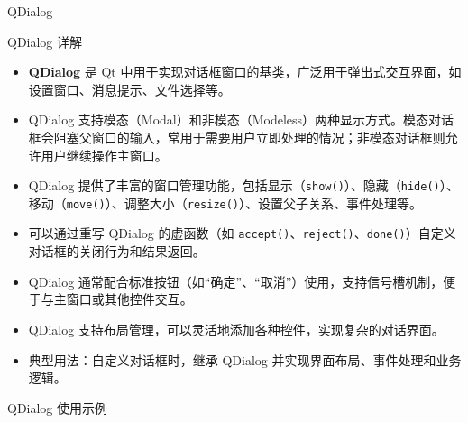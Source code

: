 \documentclass[UTF8,aspectratio=169]{beamer}
\begin{document}
\begin{frame}{QDialog}
    \begin{ytublock}{QDialog 详解}
        \begin{itemize}
            \item \textbf{QDialog} 是 Qt 中用于实现对话框窗口的基类，广泛用于弹出式交互界面，如设置窗口、消息提示、文件选择等。
            \item QDialog 支持模态（Modal）和非模态（Modeless）两种显示方式。模态对话框会阻塞父窗口的输入，常用于需要用户立即处理的情况；非模态对话框则允许用户继续操作主窗口。
            \item QDialog 提供了丰富的窗口管理功能，包括显示（\texttt{show()}）、隐藏（\texttt{hide()}）、移动（\texttt{move()}）、调整大小（\texttt{resize()}）、设置父子关系、事件处理等。
            \item 可以通过重写 QDialog 的虚函数（如 \texttt{accept()}、\texttt{reject()}、\texttt{done()}）自定义对话框的关闭行为和结果返回。
            \item QDialog 通常配合标准按钮（如“确定”、“取消”）使用，支持信号槽机制，便于与主窗口或其他控件交互。
            \item QDialog 支持布局管理，可以灵活地添加各种控件，实现复杂的对话界面。
            \item 典型用法：自定义对话框时，继承 QDialog 并实现界面布局、事件处理和业务逻辑。
        \end{itemize}
    \end{ytublock}
\end{frame}

\begin{frame}[fragile]{QDialog 使用示例}
    \begin{columns}
        \begin{column}{0.48\textwidth}
            \inputminted[firstline=1,lastline=20]{cpp}{code/qt_dialog_example.cpp}
        \end{column}
        \begin{column}{0.48\textwidth}
            \inputminted[firstline=21,lastline=40]{cpp}{code/qt_dialog_example.cpp}
        \end{column}
    \end{columns}
\end{frame}
\end{document}
